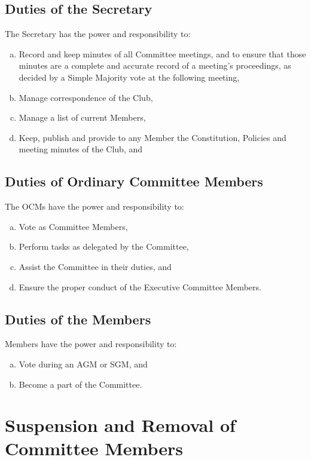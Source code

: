 \documentclass[a4paper,12pt]{article}
\begin{document}
\subsection{Duties of the Secretary}

The Secretary has the power and responsibility to:

\begin{enumerate}[a)]
	\item Record and keep minutes of all Committee meetings, and to ensure that those minutes are a complete and accurate record of a meeting's proceedings, as decided by a Simple Majority vote at the following meeting,
	\item Manage correspondence of the Club,
	\item Manage a list of current Members,
	\item Keep, publish and provide to any Member the Constitution, Policies and meeting minutes of the Club, and
\end{enumerate}

\subsection{Duties of Ordinary Committee Members}

The OCMs have the power and responsibility to:

\begin{enumerate}[a)]
	\item Vote as Committee Members,
	\item Perform tasks as delegated by the Committee,
	\item Assist the Committee in their duties, and
	\item Ensure the proper conduct of the Executive Committee Members.
\end{enumerate}

\subsection{Duties of the Members}

Members have the power and responsibility to:

\begin{enumerate}[a)]
	\item Vote during an AGM or SGM, and
	\item Become a part of the Committee.
\end{enumerate}

\section{Suspension and Removal of Committee Members}
\end{document}
